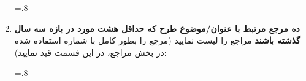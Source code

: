 \documentclass[letterpaper,11pt]{article}
\begin{document}
\begin{enumerate}
\begin{mdframed}
\renewcommand{\thempfootnote}{\arabic{mpfootnote}}
\begin{latin}
\baselineskip=.8\baselineskip
\nocite{*}
\begin{center}\end{center}\vspace{-2em}
\printbibliography[heading=none, category=primary]
\end{latin}
\end{mdframed}
\item \textbf{ده مرجع مرتبط با عنوان/موضوع طرح که حداقل هشت مورد در بازه سه سال گذشته باشند} \newline
مراجع را لیست نمایید (مرجع را بطور کامل با شماره استفاده شده در بخش مراجع، در این قسمت قید نمایید):
\begin{mdframed}
\renewcommand{\thempfootnote}{\arabic{mpfootnote}}
\begin{latin}
\baselineskip=.8\baselineskip
\nocite{*}
\begin{center}\end{center}\vspace{-2em}
\printbibliography[heading=none, category=secondary]
\end{latin}
\end{mdframed}
\end{enumerate}
\end{document}
